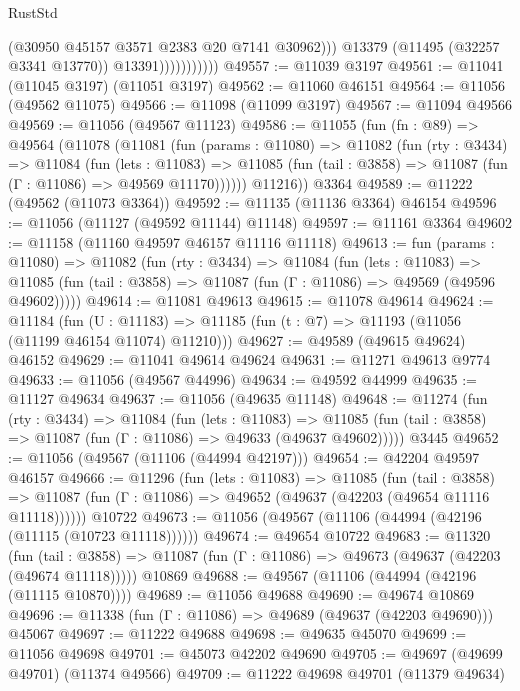 \begin{lexlean}{RustStd}
\begin{coremodule}
                              (@30950 @45157 @3571 @2383 @20 @7141 @30962)))
                          @13379
                          (@11495 (@32257 @3341 @13770))
                          @13391)))))))))))
@49557 := @11039 @3197
@49561 := @11041 (@11045 @3197) (@11051 @3197)
@49562 := @11060 @46151
@49564 := @11056 (@49562 @11075)
@49566 := @11098 (@11099 @3197)
@49567 := @11094 @49566
@49569 := @11056 (@49567 @11123)
@49586 := @11055
    (fun (fn : @89) =>
    @49564
      (@11078
        (@11081
          (fun (params : @11080) =>
          @11082
            (fun (rty : @3434) =>
            @11084
              (fun (lets : @11083) =>
              @11085 (fun (tail : @3858) => @11087 (fun (Γ : @11086) => @49569 @11170))))))
        @11216))
    @3364
@49589 := @11222 (@49562 (@11073 @3364))
@49592 := @11135 (@11136 @3364) @46154
@49596 := @11056 (@11127 (@49592 @11144) @11148)
@49597 := @11161 @3364
@49602 := @11158 (@11160 @49597 @46157 @11116 @11118)
@49613 := fun (params : @11080) =>
  @11082
    (fun (rty : @3434) =>
    @11084
      (fun (lets : @11083) =>
      @11085 (fun (tail : @3858) => @11087 (fun (Γ : @11086) => @49569 (@49596 @49602)))))
@49614 := @11081 @49613
@49615 := @11078 @49614
@49624 := @11184
    (fun (U : @11183) => @11185 (fun (t : @7) => @11193 (@11056 (@11199 @46154 @11074) @11210)))
@49627 := @49589 (@49615 @49624) @46152
@49629 := @11041 @49614 @49624
@49631 := @11271 @49613 @9774
@49633 := @11056 (@49567 @44996)
@49634 := @49592 @44999
@49635 := @11127 @49634
@49637 := @11056 (@49635 @11148)
@49648 := @11274
    (fun (rty : @3434) =>
    @11084
      (fun (lets : @11083) =>
      @11085 (fun (tail : @3858) => @11087 (fun (Γ : @11086) => @49633 (@49637 @49602)))))
    @3445
@49652 := @11056 (@49567 (@11106 (@44994 @42197)))
@49654 := @42204 @49597 @46157
@49666 := @11296
    (fun (lets : @11083) =>
    @11085
      (fun (tail : @3858) =>
      @11087 (fun (Γ : @11086) => @49652 (@49637 (@42203 (@49654 @11116 @11118))))))
    @10722
@49673 := @11056 (@49567 (@11106 (@44994 (@42196 (@11115 (@10723 @11118))))))
@49674 := @49654 @10722
@49683 := @11320
    (fun (tail : @3858) => @11087 (fun (Γ : @11086) => @49673 (@49637 (@42203 (@49674 @11118)))))
    @10869
@49688 := @49567 (@11106 (@44994 (@42196 (@11115 @10870))))
@49689 := @11056 @49688
@49690 := @49674 @10869
@49696 := @11338 (fun (Γ : @11086) => @49689 (@49637 (@42203 @49690))) @45067
@49697 := @11222 @49688
@49698 := @49635 @45070
@49699 := @11056 @49698
@49701 := @45073 @42202 @49690
@49705 := @49697 (@49699 @49701) (@11374 @49566)
@49709 := @11222 @49698 @49701 (@11379 @49634)

\end{coremodule}
\end{lexlean}
